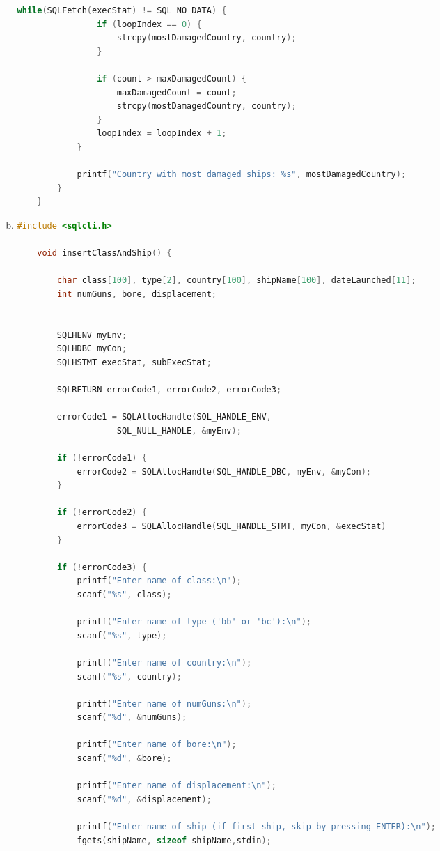 \documentclass[12pt]{article}
\begin{document}
\begin{enumerate}[1.]
\begin{enumerate}[a)]
\begin{lstlisting}[language=c]
            while(SQLFetch(execStat) != SQL_NO_DATA) {
                if (loopIndex == 0) {
                    strcpy(mostDamagedCountry, country);
                }

                if (count > maxDamagedCount) {
                    maxDamagedCount = count;
                    strcpy(mostDamagedCountry, country);
                }
                loopIndex = loopIndex + 1;
            }

            printf("Country with most damaged ships: %s", mostDamagedCountry);
        }
    }
    \end{lstlisting}

        \item

    \begin{lstlisting}[language=c]
    #include <sqlcli.h>

    void insertClassAndShip() {

        char class[100], type[2], country[100], shipName[100], dateLaunched[11];
        int numGuns, bore, displacement;


        SQLHENV myEnv;
        SQLHDBC myCon;
        SQLHSTMT execStat, subExecStat;

        SQLRETURN errorCode1, errorCode2, errorCode3;

        errorCode1 = SQLAllocHandle(SQL_HANDLE_ENV,
                    SQL_NULL_HANDLE, &myEnv);

        if (!errorCode1) {
            errorCode2 = SQLAllocHandle(SQL_HANDLE_DBC, myEnv, &myCon);
        }

        if (!errorCode2) {
            errorCode3 = SQLAllocHandle(SQL_HANDLE_STMT, myCon, &execStat)
        }

        if (!errorCode3) {
            printf("Enter name of class:\n");
            scanf("%s", class);

            printf("Enter name of type ('bb' or 'bc'):\n");
            scanf("%s", type);

            printf("Enter name of country:\n");
            scanf("%s", country);

            printf("Enter name of numGuns:\n");
            scanf("%d", &numGuns);

            printf("Enter name of bore:\n");
            scanf("%d", &bore);

            printf("Enter name of displacement:\n");
            scanf("%d", &displacement);

            printf("Enter name of ship (if first ship, skip by pressing ENTER):\n");
            fgets(shipName, sizeof shipName,stdin);


\end{lstlisting}
\end{enumerate}
\end{enumerate}
\end{document}

